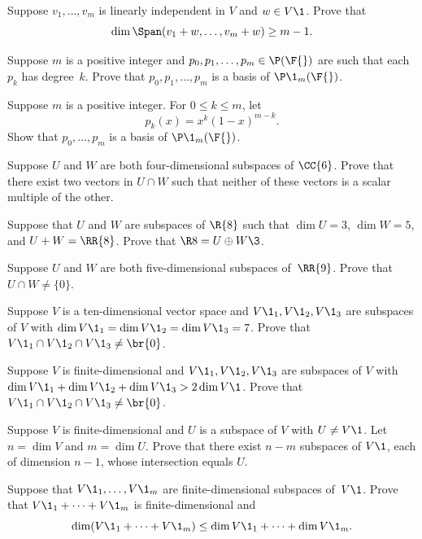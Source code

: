 \exercise
Suppose $v_1, \dots, v_m$ is linearly independent in $V$ and $w \in V\1$. Prove that
\[
\dim \Span(v_1 + w, \dots, v_m + w) \ge m-1.
\]
\exercisedisplayend


\exercise
Suppose $m$ is a positive integer and $p_0, p_1, \dots, p_m \in \P(\F{})$ are such that each
$p_k$ has degree~$k$.  Prove that $p_0, p_1, \dots, p_m$ is a basis of $\P\1_m(\F{})$.


\exercise
Suppose $m$ is a positive integer. For $0 \le k \le m$, let
\[
p_k(x) = x^k (1-x)^{m-k}.
\]
Show that $p_0, \ldots, p_m$ is a basis of $\P\1_m(\F{})$.


\exercise
Suppose $U$ and $W$ are both four-dimensional subspaces of $\CC{6}$.
Prove that there exist two vectors in $U \cap W$ such that neither of these vectors is a scalar multiple of the other.


\exercise
Suppose that $U$ and $W$ are subspaces of $\R{8}$ such that $\dim U = 3$,
$\dim W = 5$, and $U + W = \RR{8}$.  Prove that $\R8 = U \oplus W\3$. \label{7exer}


\exercise
Suppose $U$ and $W$ are both five-dimensional subspaces of~$\RR{9}$.
Prove that $U \cap W \ne \{0\}$.


\exercise
Suppose $V$ is a ten-dimensional vector space and $V\1_1, V\1_2, V\1_3$ are subspaces of $V$ with
$\dim V\1_1 = \dim V\1_2 = \dim V\1_3 = 7$. Prove that $V\1_1 \cap V\1_2 \cap V\1_3 \ne \br{0}$.


\exercise
Suppose $V$ is finite-dimensional and $V\1_1, V\1_2, V\1_3$ are subspaces of $V$ with
$\dim V\1_1 + \dim V\1_2 + \dim V\1_3 > 2 \dim V\1$. Prove that $V\1_1 \cap V\1_2 \cap V\1_3 \ne \br{0}$.


\exercise
Suppose $V$ is finite-dimensional and $U$ is a subspace of $V$ with $U \ne V\1$. Let $n = \dim V$ and $m = \dim U$. Prove that there exist $n - m$ subspaces of $V\1$, each of dimension $n-1$, whose intersection equals $U$.


\exercise
Suppose that $V\1_1, \dots, V\1_m$ are finite-dimensional subspaces of~$V\1$. Prove that $V\1_1 + \dots + V\1_m$ is finite-dimensional and
\[
\dim (V\1_1 + \dots + V\1_m) \le \dim V\1_1 + \dots + \dim V\1_m.
\]
{}


